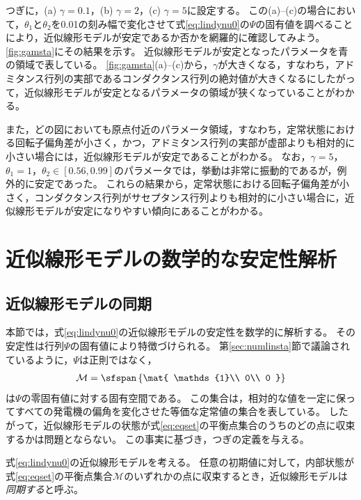 \documentclass[tombow,dvipdfmx]{corona-a5}
\begin{document}
\begin{例}[近似線形モデルの数値的な安定性解析]
つぎに，(a) $\gamma=0.1$，(b) $\gamma=2$，(c) $\gamma=5$に設定する。
この(a)--(c)の場合において，$\theta_1$と$\theta_2$を0.01の刻み幅で変化させて式\ref{eq:lindynu0}の$\Psi$の固有値を調べることにより，近似線形モデルが安定であるか否かを網羅的に確認してみよう。
\ref{fig:gamsta}にその結果を示す。
近似線形モデルが安定となったパラメータを青の領域で表している。
\ref{fig:gamsta}(a)--(c)から，$\gamma$が大きくなる，すなわち，アドミタンス行列の実部であるコンダクタンス行列の絶対値が大きくなるにしたがって，近似線形モデルが安定となるパラメータの領域が狭くなっていることがわかる。

また，どの図においても原点付近のパラメータ領域，すなわち，定常状態における回転子偏角差が小さく，かつ，アドミタンス行列の実部が虚部よりも相対的に小さい場合には，近似線形モデルが安定であることがわかる。
なお，$\gamma=5$，$\theta_1=1$，$\theta_2 \in [0.56,0.99]$のパラメータでは，挙動は非常に振動的であるが，例外的に安定であった。
これらの結果から，定常状態における回転子偏角差が小さく，コンダクタンス行列がサセプタンス行列よりも相対的に小さい場合に，近似線形モデルが安定になりやすい傾向にあることがわかる。
\end{例}




\section{近似線形モデルの数学的な安定性解析\advanced}

\subsection{近似線形モデルの同期}

本節では，式\ref{eq:lindynu0}の近似線形モデルの安定性を数学的に解析する。
その安定性は行列$\Psi$の固有値により特徴づけられる。
第\ref{sec:numlinsta}節で議論されているように，$\Psi$は正則ではなく，
\begin{align}\label{eq:eqset}
\mathcal{M} =
 \sfspan\left\{
 \mat{
 \mathds{1}\\
 0\\
 0
 }
 \right\}
\end{align}
は$\Psi$の零固有値に対する固有空間である。
この集合は，相対的な値を一定に保ってすべての発電機の偏角を変化させた等価な定常値の集合を表している。
したがって，近似線形モデルの状態が式\ref{eq:eqset}の平衡点集合のうちのどの点に収束するかは問題とならない。
この事実に基づき，つぎの定義を与える。

\begin{定義}[近似線形モデルの同期]
\label{def:stalin}
式\ref{eq:lindynu0}の近似線形モデルを考える。
任意の初期値に対して，内部状態が式\ref{eq:eqset}の平衡点集合$\mathcal{M}$のいずれかの点に収束するとき，近似線形モデルは\emph{同期する}と呼ぶ。
\end{定義}
\end{document}
